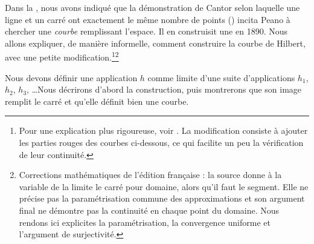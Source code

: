 \documentclass[../../../include/open-logic-section]{subfiles}
\begin{document}


Dans la , nous avons indiqué que
la démonstration de Cantor selon laquelle une ligne et un carré
ont exactement le même nombre de points
() incita Peano à
chercher une \emph{courbe} remplissant l'espace. Il en construisit
une en 1890. Nous allons expliquer, de manière informelle, comment
construire la courbe de Hilbert, avec une petite modification.\footnote{
Pour une explication plus rigoureuse, voir \cite{Rose2010}. La
modification consiste à ajouter les parties rouges des courbes
ci-dessous, ce qui facilite un peu la vérification de leur
continuité.}\footnote{Corrections mathématiques de l'édition
française : la source donne à la variable de la limite le carré
pour domaine, alors qu'il faut le segment. Elle ne précise pas
la paramétrisation commune des approximations et son argument
final ne démontre pas la continuité en chaque point du domaine.
Nous rendons ici explicites la paramétrisation, la convergence
uniforme et l'argument de surjectivité.}

Nous devons définir une application $h$ comme limite d'une suite
d'applications $h_1$, $h_2$, $h_3$, \dots\@ Nous décrirons d'abord
la construction, puis montrerons que son image remplit le carré
et qu'elle définit bien une courbe.
\end{document}
